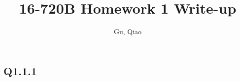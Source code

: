 \documentclass[11pt]{article}
\begin{document}
\author{Gu, Qiao}
\title{16-720B Homework 1 Write-up}
\maketitle

\medskip

\subsection*{Q1.1.1}
\end{document}
